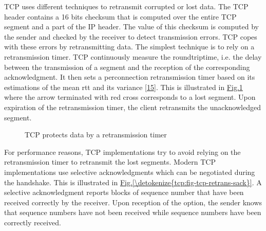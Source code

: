 \documentclass[letterpaper,10pt,english]{sphinxmanual}
\begin{document}
\sphinxAtStartPar
TCP uses different techniques to retransmit corrupted or lost data. The TCP header contains a 16 bits checksum that is computed over the entire TCP segment and a part of the IP header. The value of this checksum is computed by the sender and checked by the receiver to detect transmission errors. TCP copes with these errors by retransmitting data. The simplest technique is to rely on a retransmission timer. TCP continuously measure the round\sphinxhyphen{}trip\sphinxhyphen{}time, i.e. the delay between the transmission of a segment and the reception of the corresponding acknowledgment. It then sets a per\sphinxhyphen{}connection retransmission timer based on its estimations of the mean rtt and its variance {[}\hyperlink{cite.biblio:id6147}{15}{]}. This is illustrated in \hyperref[\detokenize{tcp:fig-tcp-retrans}]{Fig.\@ \ref{\detokenize{tcp:fig-tcp-retrans}}} where the arrow terminated with red cross corresponds to a lost segment. Upon expiration of the retransmission timer, the client retransmits the unacknowledged segment.
\begin{figure}[htbp]\centering\capstart{}\caption{TCP protects data by a retransmission timer}\label{\detokenize{tcp:id10}}\label{\detokenize{tcp:fig-tcp-retrans}}\end{figure}
\sphinxAtStartPar
For performance reasons, TCP implementations try to avoid relying on the retransmission timer to retransmit the lost segments. Modern TCP implementations use selective acknowledgments which can be negotiated during the handshake. This is illustrated in \hyperref[\detokenize{tcp:fig-tcp-retrans-sack}]{Fig.\@ \ref{\detokenize{tcp:fig-tcp-retrans-sack}}}. A selective acknowledgment reports blocks of sequence number that have been received correctly by the receiver. Upon reception of the  option, the sender knows that sequence numbers  have not been received while sequence numbers  have been correctly received.
\end{document}
